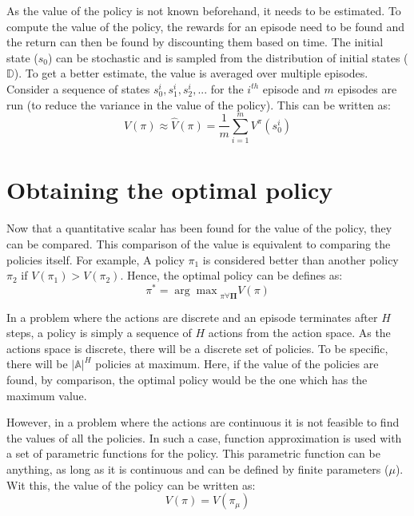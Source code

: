 \documentclass[hidelinks,BTech]{iitmdiss}
\begin{document}
As the value of the policy is not known beforehand, it needs to be estimated. To compute the value of the policy, the rewards for an episode need to be found and the return can then be found by discounting them based on time. The initial state ($s_0$) can be stochastic and is sampled from the distribution of initial states ($\mathbb{D}$). To get a better estimate, the value is averaged over multiple episodes. Consider a sequence of states ${s_{0}^{i}, s_{1}^{i}, s_{2}^{i}, ...}$ for the $i^{th}$ episode and $m$ episodes are run (to reduce the variance in the value of the policy). This can be written as:
\begin{equation}
  V(\pi) \approx \hat{V}(\pi) = \frac{1}{m} \sum_{i=1}^{m} V^{\pi} (s_{0}^{i})
\end{equation}

\section{Obtaining the optimal policy}

Now that a quantitative scalar has been found for the value of the policy, they can be compared. This comparison of the value is equivalent to comparing the policies itself. For example, A policy $\pi_{1}$ is considered better than another policy $\pi_{2}$ if $V(\pi_{1}) > V(\pi_{2})$. Hence, the optimal policy can be defines as:
\begin{equation}
  \pi^{*} = {\arg \max}_{\pi \forall \mathbf{\Pi}} {V(\pi)}
\end{equation}

In a problem where the actions are discrete and an episode terminates after $H$ steps, a policy is simply a sequence of $H$ actions from the action space. As the actions space is discrete, there will be a discrete set of policies. To be specific, there will be $|\mathbb{A}|^{H}$ policies at maximum. Here, if the value of the policies are found, by comparison, the optimal policy would be the one which has the maximum value.

However, in a problem where the actions are continuous it is not feasible to find the values of all the policies. In such a case, function approximation is used with a set of parametric functions for the policy. This parametric function can be anything, as long as it is continuous and can be defined by finite parameters ($\mu$). Wit this, the value of the policy can be written as:
\begin{equation}
  V(\pi) = V(\pi_{\mu})
\end{equation}
\end{document}
